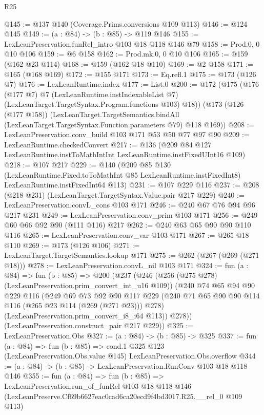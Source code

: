 \begin{lexlean}{R25}
\begin{coremodule}
@145 := @137 @140 (Coverage.Prims.conversions @109 @113)
@146 := @124 @145
@149 := (a : @84) -> (b : @85) -> @119 @146
@155 := LexLeanPreservation.funRel_intro @103 @18 @118 @146 @79
@158 := Prod.{0, 0} @10 @106
@159 := @6 @158
@162 := Prod.mk.{0, 0} @10 @106
@165 := @159 (@162 @23 @114)
@168 := @159 (@162 @18 @110)
@169 := @2 @158
@171 := @165 (@168 @169)
@172 := @155 @171
@173 := Eq.refl.{1}
@175 := @173 (@126 @7)
@176 := LexLeanRuntime.index
@177 := List.{0}
@200 := @172
    (@175
      (@176
        (@177 @7)
        @7
        (LexLeanRuntime.instIndexableList @7)
        (LexLeanTarget.TargetSyntax.Program.functions @103)
        @18))
    (@173
      (@126 (@177 @158))
      (LexLeanTarget.TargetSemantics.bindAll
        (LexLeanTarget.TargetSyntax.Function.parameters @79)
        @118
        @169))
@208 := LexLeanPreservation.conv_build @103 @171 @53 @50 @77 @97 @90
@209 := LexLeanRuntime.checkedConvert
@217 := @136 (@209 @84 @127 LexLeanRuntime.instToMathIntInt LexLeanRuntime.instFixedUInt16 @109)
@218 := @107 @217
@229 := @140
    (@209
      @85
      @130
      (LexLeanRuntime.Fixed.toToMathInt @85 LexLeanRuntime.instFixedInt8)
      LexLeanRuntime.instFixedInt64
      @113)
@231 := @107 @229 @116
@237 := @208 (@218 @231) (LexLeanTarget.TargetSyntax.Value.pair @217 @229)
@240 := LexLeanPreservation.convL_cons @103 @171
@246 := @240 @67 @76 @94 @96 @217 @231
@249 := LexLeanPreservation.conv_prim @103 @171
@256 := @249 @60 @66 @92 @90 (@111 @116) @217
@262 := @240 @63 @65 @90 @90 @110 @116
@265 := LexLeanPreservation.conv_var @103 @171
@267 := @265 @18 @110
@269 := @173 (@126 @106)
@271 := LexLeanTarget.TargetSemantics.lookup @171
@275 := @262 (@267 (@269 (@271 @18)))
@278 := LexLeanPreservation.convL_nil @103 @171
@324 := fun (a : @84) =>
  fun (b : @85) =>
  @200
    (@237
      (@246
        (@256 (@275 @278) (LexLeanPreservation.prim_convert_int_u16 @109))
        (@240
          @74
          @65
          @94
          @90
          @229
          @116
          (@249
            @69
            @73
            @92
            @90
            @117
            @229
            (@240 @71 @65 @90 @90 @114 @116 (@265 @23 @114 (@269 (@271 @23))) @278)
            (LexLeanPreservation.prim_convert_i8_i64 @113))
          @278))
      (LexLeanPreservation.construct_pair @217 @229))
@325 := LexLeanPreservation.Obs
@327 := (a : @84) -> (b : @85) -> @325
@337 := fun (a : @84) =>
  fun (b : @85) =>
  cond.{1} @325 @123 (LexLeanPreservation.Obs.value @145) LexLeanPreservation.Obs.overflow
@344 := (a : @84) -> (b : @85) -> LexLeanPreservation.RunConv @103 @18 @118 @146
@355 := fun (a : @84) =>
  fun (b : @85) =>
  LexLeanPreservation.run_of_funRel
    @103
    @18
    @118
    @146
    (LexLeanPreserve.Cf69b6627eac0cad6ca20ecd9f4bd3017.R25.__rel_0 @109 @113)
\end{coremodule}
\end{lexlean}
